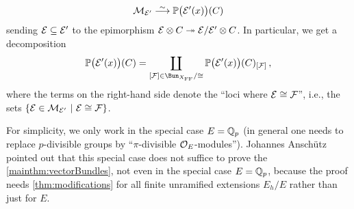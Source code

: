 \documentclass[a4paper, 10pt, oneside, DIV=9, chapterprefix=true, numbers=enddot,bibliography=totoc]{scrbook}
\begin{document}
\begin{equation*}
	\Mm_{\Ee'}\isomorphism \IP\big(\Ee'(x)\big)(C)
\end{equation*}
sending $\mathcal{E}\subseteq \mathcal{E}'$ to the epimorphism $\Ee\otimes C\epimorphism\Ee/\Ee'\otimes C$. In particular, we get a decomposition 
\begin{equation*}
	\IP\big(\Ee'(x)\big)(C)=\coprod_{[\Ff]\in \Bun_{X_\FFC}/\cong}\IP\big(\Ee'(x)\big)(C)_{[\Ff]}\,,
\end{equation*}
where the terms on the right-hand side denote the \enquote{loci where $\mathcal{E}\cong \mathcal{F}$}, i.e., the sets $\left\{\mathcal{E}\in \mathcal{M}_{\mathcal{E}'}\ \middle|\  \mathcal{E}\cong \mathcal{F}\right\}$.

\numpar{}For simplicity, we only work in the special case $E=\mathbb{Q}_p$ (in general one needs to replace $p$-divisible groups by \enquote{$\pi$-divisible $\mathcal{O}_E$-modules}). Johannes Anschütz pointed out that this special case does not suffice to prove the \cref{mainthm:vectorBundles}, not even in the special case $E=\mathbb{Q}_p$, because the proof needs \cref{thm:modifications} for all finite unramified extensions $E_h/E$ rather than just for $E$.
\end{document}
